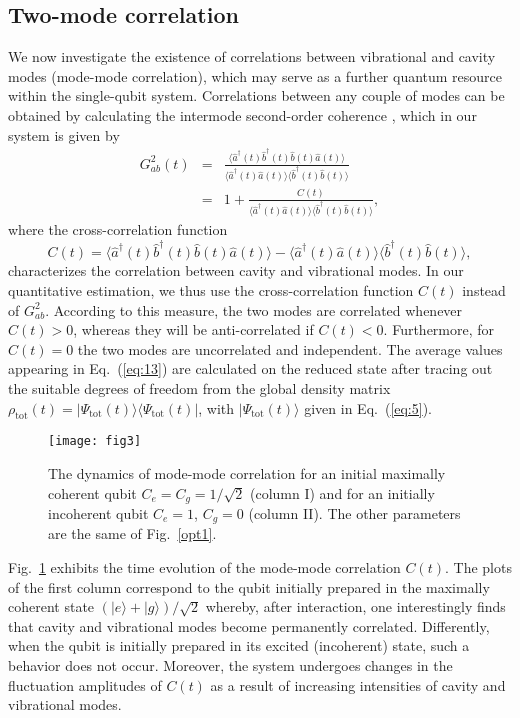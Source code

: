 \documentclass[twocolumn,3p,times]{elsarticle}
\newcommand{\ket}[1]{|#1\rangle}
\begin{document}
\subsection{Two-mode correlation}
We now investigate the existence of correlations between vibrational and cavity modes (mode-mode correlation), which may serve as a further quantum resource within the single-qubit system.
Correlations between any couple of modes can be obtained by calculating the intermode second-order coherence \cite{PRA458037,RepProgPhys4358,PRA86023810,ExpThePhy122984}, which in our system is given by
\begin{eqnarray}
\label{eq:11} 
G_{ab}^{2}(t)&=&\frac{\langle\hat a^{\dagger}(t)\hat b^{\dagger}(t)\hat b(t)\hat a(t)\rangle}{\langle\hat a^{\dagger}(t)\hat a(t)\rangle \langle\hat b^{\dagger}(t)\hat b(t)\rangle}\nonumber \\
&=& 1+\frac{C(t)}{\langle \hat a^{\dagger}(t)\hat a(t)\rangle \langle \hat b^{\dagger}(t)\hat b(t)\rangle},
\end{eqnarray} 
where the cross-correlation function
\begin{equation}
\label{eq:13} 
C(t)=\langle \hat a^{\dagger}(t)\hat b^{\dagger}(t)\hat b(t)\hat a(t)\rangle -
\langle \hat a^{\dagger}(t)\hat a(t)\rangle \langle \hat b^{\dagger}(t)\hat b(t)\rangle, 
\end{equation}
characterizes the correlation between cavity and vibrational modes. In our quantitative estimation, we thus use the cross-correlation function $C(t)$ instead of $G_{ab}^{2}$. According to this measure, the two modes are correlated whenever $C(t)>0$, whereas they will be anti-correlated if $C(t)<0$. Furthermore, for $C(t)=0$ the two modes are uncorrelated and independent. The average values appearing in Eq.~(\ref{eq:13}) are calculated on the reduced state after tracing out the suitable degrees of freedom from the global density matrix $\rho_\mathrm{tot}(t)=\lvert\Psi_\mathrm{tot}(t)\rangle\langle\Psi_\mathrm{tot}(t)\lvert$, with $\lvert\Psi_\mathrm{tot}(t)\rangle$ given in Eq.~(\ref{eq:5}). 

\begin{figure}[t!]
\texttt{[image: fig3]}
\caption{The dynamics of mode-mode correlation for an initial maximally coherent qubit $C_{e}=C_{g}=1/\sqrt{2}$ (column I) and for an initially incoherent qubit $C_{e}=1$, $C_{g}=0$ (column II). The other parameters are the same of Fig.~\ref{opt1}.}
\label{opt3}
\end{figure}

Fig.~\ref{opt3} exhibits the time evolution of the mode-mode correlation $C(t)$. The plots of the first column correspond to the qubit initially prepared in the maximally coherent state $(\ket{e}+\ket{g})/\sqrt{2}$ whereby, after interaction, one interestingly finds that cavity and vibrational modes become permanently correlated. Differently, when the qubit is initially prepared in its excited (incoherent) state, such a behavior does not occur. Moreover, the system undergoes changes in the fluctuation amplitudes of $C(t)$ as a result of increasing intensities of cavity and vibrational modes.
\end{document}
